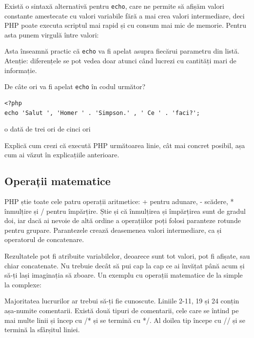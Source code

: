 Există o sintaxă alternativă pentru \texttt{echo}, care ne permite
să afișăm valori constante amestecate cu valori variabile fără
a mai crea valori intermediare, deci PHP poate executa
scriptul mai rapid și cu consum mai mic de memorie.
Pentru asta punem virgulă între valori:


Asta înseamnă practic că \texttt{echo} va fi apelat asupra fiecărui
parametru din listă. Atenție: diferențele se pot vedea
doar atunci când lucrezi cu cantități mari de informație.

\begin{Exercise}[difficulty=1,title={Sintaxa alternativă pentru echo}]
De câte ori va fi apelat \texttt{echo} în codul următor? %
\begin{lstlisting}
<?php
echo 'Salut ', 'Homer ' . 'Simpson.' , ' Ce ' . 'faci?';
\end{lstlisting}
\Question o dată
\Question de trei ori
\Question de cinci ori
\end{Exercise}

\begin{Exercise}[difficulty=2,title={Determinarea fluxului de execuție într-un exemplu simplu}]
Explică cum crezi că execută PHP următoarea linie, cât mai concret posibil, așa cum
ai văzut în explicațiile anterioare.

\end{Exercise}

\subsection{Operații matematice}

PHP știe toate cele patru operații aritmetice: + pentru adunare,
- scădere, * înmulțire și / pentru împărțire. Știe și că
înmulțirea și împărțirea sunt de gradul doi, iar dacă ai nevoie
de altă ordine a operațiilor poți folosi paranteze rotunde pentru
grupare. Parantezele crează deasemenea valori intermediare, ca
și operatorul de concatenare.

Rezultatele pot fi atribuite variabilelor, deoarece sunt tot
valori, pot fi afișate, sau chiar concatenate. Nu trebuie decât
să pui cap la cap ce ai învățat până acum și să-ți lași imaginația
să zboare.
Un exemplu cu operații matematice de la simple la complexe:


Majoritatea lucrurilor ar trebui să-ți fie cunoscute. Liniile
2-11, 19 și 24 conțin așa-numite comentarii. Există două
tipuri de comentarii, cele care se întind pe mai multe linii
și încep cu {\glqq}/*{\grqq} și se termină cu {\glqq}*/{\grqq}. Al doilea tip
începe cu {\glqq}//{\grqq} și se termină la sfârșitul liniei.

